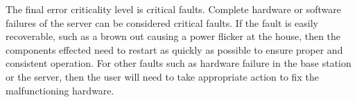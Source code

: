 \documentclass{report}
\begin{document}
The final error criticality level is critical faults. Complete hardware or
software failures of the server can be considered critical faults. If the fault
is easily recoverable, such as a brown out causing a power flicker at the
house, then the components effected need to restart as quickly as possible to
ensure proper and consistent operation. For other faults such as hardware
failure in the base station or the server, then the user will need to take
appropriate action to fix the malfunctioning hardware.
\end{document}
